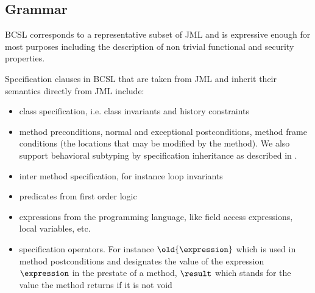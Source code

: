 \subsection{Grammar} \label{grammar}


BCSL corresponds to a representative subset of JML and is expressive enough for most purposes including the description of non trivial functional and 
 security properties.

 Specification clauses in BCSL that are taken from JML and inherit their semantics directly from JML include:
\begin{itemize}
   \item class specification, i.e. class invariants and history constraints
   \item  method preconditions, normal and exceptional postconditions, method frame conditions (the locations that may be modified by the method). 
     We also support behavioral subtyping by specification inheritance as described in \cite{Dhara-Leavens95b}.
   \item inter method specification, for instance loop invariants
   \item predicates from first order logic   
      
\item expressions from the programming language, like field access expressions, local variables, etc.
\item specification operators. For instance  $\old{\expression}$ which is used in method postconditions and
 designates the value of the expression $\expression$ in the prestate of a method, $ \result$ which stands for the value the method
returns if it is not void  
\end{itemize}

